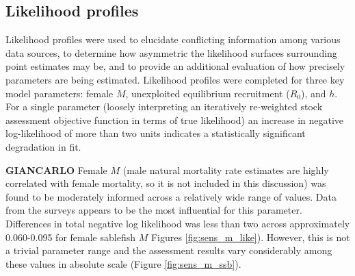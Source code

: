 \documentclass[11pt,
  english,
  a4paper,
]{article}
\begin{document}

\hypertarget{likelihood-profiles}{%
\subsection{Likelihood profiles}\label{likelihood-profiles}}

\leavevmode\tagmcend\tagstructend


Likelihood profiles were used to elucidate conflicting information among various data sources, to determine how asymmetric the likelihood surfaces surrounding point estimates may be, and to provide an additional evaluation of how precisely parameters are being estimated. Likelihood profiles were completed for three key model parameters: female {\(M\)\leavevmode\tagmcend\tagstructend}, unexploited equilibrium recruitment ({\(R_0\)\leavevmode\tagmcend\tagstructend}), and {\(h\)\leavevmode\tagmcend\tagstructend}. For a single parameter (loosely interpreting an iteratively re-weighted stock assessment objective function in terms of true likelihood) an increase in negative log-likelihood of more than two units indicates a statistically significant degradation in fit.

\leavevmode\tagmcend\tagstructend\par


\textbf{GIANCARLO} Female {\(M\)\leavevmode\tagmcend\tagstructend} (male natural mortality rate estimates are highly correlated with female mortality, so it is not included in this discussion) was found to be moderately informed across a relatively wide range of values. Data from the surveys appears to be the most influential for this parameter. Differences in total negative log likelihood was less than two across approximately 0.060-0.095 for female sablefish {\(M\)\leavevmode\tagmcend\tagstructend} Figures \ref{fig:sens_m_like}). However, this is not a trivial parameter range and the assessment results vary considerably among these values in absolute scale (Figure \ref{fig:sens_m_ssb}).

\leavevmode\tagmcend\tagstructend\par
\end{document}
